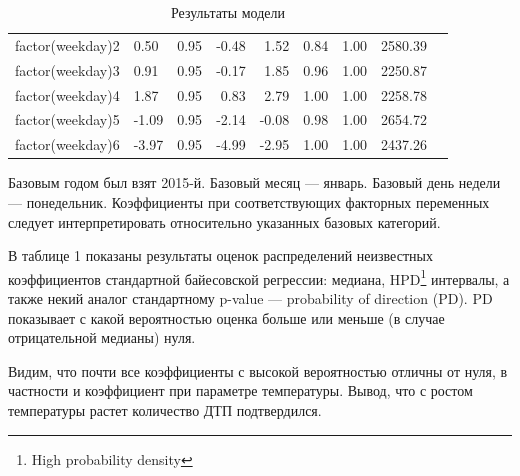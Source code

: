 \documentclass[a4paper, 14pt]{article}
\begin{document}
\begin{table}[ht]
\begin{tabular}{rlrrrrrrr}
		factor(weekday)2 & 0.50 & 0.95 & -0.48 & 1.52 & 0.84 & 1.00 & 2580.39 \\ 
		factor(weekday)3 & 0.91 & 0.95 & -0.17 & 1.85 & 0.96 & 1.00 & 2250.87 \\ 
		factor(weekday)4 & 1.87 & 0.95 & 0.83 & 2.79 & 1.00 & 1.00 & 2258.78 \\ 
		factor(weekday)5 & -1.09 & 0.95 & -2.14 & -0.08 & 0.98 & 1.00 & 2654.72 \\ 
		factor(weekday)6 & -3.97 & 0.95 & -4.99 & -2.95 & 1.00 & 1.00 & 2437.26 \\ 
		\hline
	\end{tabular}
	\caption{Результаты модели}
\end{table}

Базовым годом был взят 2015-й. Базовый месяц --- январь. Базовый день недели --- понедельник. Коэффициенты при соответствующих факторных переменных следует интерпретировать относительно указанных базовых категорий.

В таблице 1 показаны результаты оценок распределений неизвестных коэффициентов стандартной байесовской регрессии: медиана, HPD\footnote{High probability density} интервалы, а также некий аналог стандартному p-value --- probability of direction (PD). PD показывает с какой вероятностью оценка больше или меньше (в случае отрицательной медианы) нуля.

Видим, что почти все коэффициенты с высокой вероятностью отличны от нуля, в частности и коэффициент при параметре температуры. Вывод, что с ростом температуры растет количество ДТП подтвердился.  

 




\newpage
\end{document}
